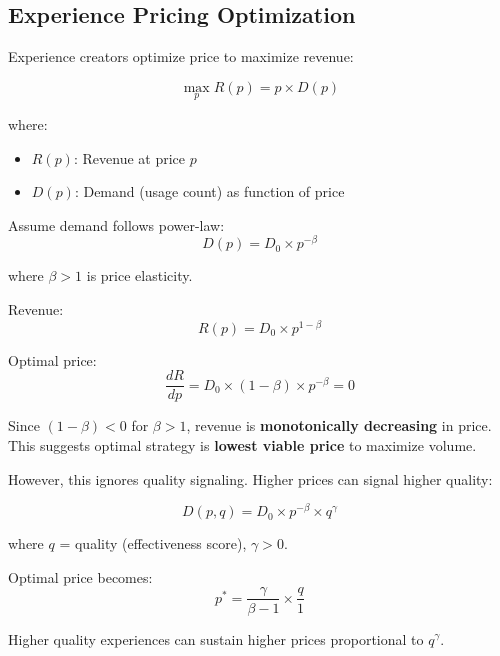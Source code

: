 \subsection{Experience Pricing Optimization}

Experience creators optimize price to maximize revenue:

\begin{equation}
\max_{p} R(p) = p \times D(p)
\end{equation}

where:
\begin{itemize}
\item $R(p)$: Revenue at price $p$
\item $D(p)$: Demand (usage count) as function of price
\end{itemize}

Assume demand follows power-law:
\begin{equation}
D(p) = D_0 \times p^{-\beta}
\end{equation}

where $\beta > 1$ is price elasticity.

Revenue:
\begin{equation}
R(p) = D_0 \times p^{1-\beta}
\end{equation}

Optimal price:
\begin{equation}
\frac{dR}{dp} = D_0 \times (1-\beta) \times p^{-\beta} = 0
\end{equation}

Since $(1-\beta) < 0$ for $\beta > 1$, revenue is \textbf{monotonically decreasing} in price. This suggests optimal strategy is \textbf{lowest viable price} to maximize volume.

However, this ignores quality signaling. Higher prices can signal higher quality:

\begin{equation}
D(p, q) = D_0 \times p^{-\beta} \times q^{\gamma}
\end{equation}

where $q$ = quality (effectiveness score), $\gamma > 0$.

Optimal price becomes:
\begin{equation}
p^* = \frac{\gamma}{\beta - 1} \times \frac{q}{1}
\end{equation}

Higher quality experiences can sustain higher prices proportional to $q^{\gamma}$.

